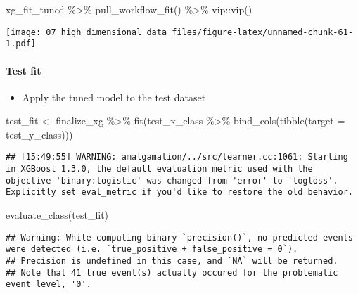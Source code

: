 \documentclass[
]{book}
\newenvironment{Shaded}{\begin{snugshade}}{\end{snugshade}}
\newcommand{\AttributeTok}[1]{\textcolor[rgb]{0.77,0.63,0.00}{#1}}
\newcommand{\FunctionTok}[1]{\textcolor[rgb]{0.00,0.00,0.00}{#1}}
\newcommand{\NormalTok}[1]{#1}
\newcommand{\OtherTok}[1]{\textcolor[rgb]{0.56,0.35,0.01}{#1}}
\newcommand{\SpecialCharTok}[1]{\textcolor[rgb]{0.00,0.00,0.00}{#1}}
\providecommand{\tightlist}{%
  \setlength{\itemsep}{0pt}\setlength{\parskip}{0pt}}
\begin{document}
\begin{Shaded}
\begin{Highlighting}[]
\NormalTok{xg\_fit\_tuned }\SpecialCharTok{\%\textgreater{}\%}
  \FunctionTok{pull\_workflow\_fit}\NormalTok{() }\SpecialCharTok{\%\textgreater{}\%}
\NormalTok{  vip}\SpecialCharTok{::}\FunctionTok{vip}\NormalTok{()}
\end{Highlighting}
\end{Shaded}

\texttt{[image: 07\_high\_dimensional\_data\_files/figure-latex/unnamed-chunk-61-1.pdf]}

\hypertarget{test-fit-3}{%
\paragraph{Test fit}\label{test-fit-3}}

\begin{itemize}
\tightlist
\item
  Apply the tuned model to the test dataset
\end{itemize}

\begin{Shaded}
\begin{Highlighting}[]
\NormalTok{test\_fit }\OtherTok{\textless{}{-}}\NormalTok{ finalize\_xg }\SpecialCharTok{\%\textgreater{}\%}
  \FunctionTok{fit}\NormalTok{(test\_x\_class }\SpecialCharTok{\%\textgreater{}\%} \FunctionTok{bind\_cols}\NormalTok{(}\FunctionTok{tibble}\NormalTok{(}\AttributeTok{target =}\NormalTok{ test\_y\_class)))}
\end{Highlighting}
\end{Shaded}

\begin{verbatim}
## [15:49:55] WARNING: amalgamation/../src/learner.cc:1061: Starting in XGBoost 1.3.0, the default evaluation metric used with the objective 'binary:logistic' was changed from 'error' to 'logloss'. Explicitly set eval_metric if you'd like to restore the old behavior.
\end{verbatim}

\begin{Shaded}
\begin{Highlighting}[]
\FunctionTok{evaluate\_class}\NormalTok{(test\_fit)}
\end{Highlighting}
\end{Shaded}

\begin{verbatim}
## Warning: While computing binary `precision()`, no predicted events were detected (i.e. `true_positive + false_positive = 0`). 
## Precision is undefined in this case, and `NA` will be returned.
## Note that 41 true event(s) actually occured for the problematic event level, '0'.
\end{verbatim}
\end{document}
